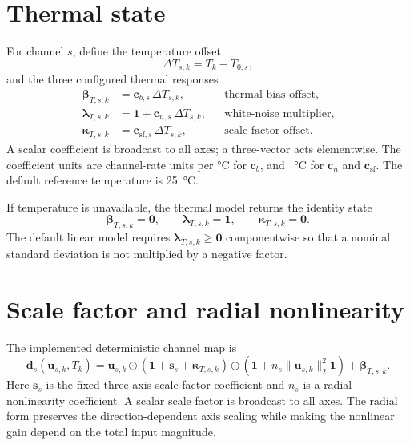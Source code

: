 \documentclass[11pt,oneside,headings=big]{scrreprt}
\newcommand{\Had}{\odot}
\newcommand{\vect}[1]{\bm{#1}}
\begin{document}
    \section{Thermal state}
    For channel \(s\), define the temperature offset
    \begin{equation}
        \Delta T_{s,k}=T_k-T_{0,s},
    \end{equation}
    and the three configured thermal responses
    \begin{align}
        \vect\beta_{T,s,k}&=\vect c_{b,s}\,\Delta T_{s,k},
        &&\text{thermal bias offset},\label{eq:thermal-bias}\\
        \vect\lambda_{T,s,k}&=\vect 1+\vect c_{n,s}\,\Delta T_{s,k},
        &&\text{white-noise multiplier},\label{eq:thermal-noise}\\
        \vect\kappa_{T,s,k}&=\vect c_{\mathrm{sf},s}\,\Delta T_{s,k},
        &&\text{scale-factor offset}.\label{eq:thermal-scale}
    \end{align}
    A scalar coefficient is broadcast to all axes; a three-vector acts elementwise.
    The coefficient units are channel-rate units per \si{\degreeCelsius} for
    \(\vect c_b\), and \si{\per\degreeCelsius} for \(\vect c_n\) and
    \(\vect c_{\mathrm{sf}}\). The default reference temperature is
    \SI{25}{\degreeCelsius}.

    If temperature is unavailable, the thermal model returns the identity state
    \begin{equation}
        \vect\beta_{T,s,k}=\vect 0,
        \qquad
        \vect\lambda_{T,s,k}=\vect 1,
        \qquad
        \vect\kappa_{T,s,k}=\vect 0.
        \label{eq:thermal-identity}
    \end{equation}
    The default linear model requires \(\vect\lambda_{T,s,k}\ge\vect0\)
    componentwise so that a nominal standard deviation is not multiplied by a
    negative factor.


    \section{Scale factor and radial nonlinearity}
    The implemented deterministic channel map is
    \begin{equation}
        \vect d_s(\vect u_{s,k},T_k)=
        \vect u_{s,k}\Had
        \left(\vect 1+\vect s_s+\vect\kappa_{T,s,k}\right)
        \Had\left(\vect 1+n_s\lVert\vect u_{s,k}\rVert_2^2\vect 1\right)
        +\vect\beta_{T,s,k}.
        \label{eq:deterministic-map}
    \end{equation}
    Here \( \vect s_s \) is the fixed three-axis scale-factor coefficient and
    \(n_s\) is a radial nonlinearity coefficient. A scalar scale factor is
    broadcast to all axes. The radial form preserves the direction-dependent axis
    scaling while making the nonlinear gain depend on the total input magnitude.
\end{document}
